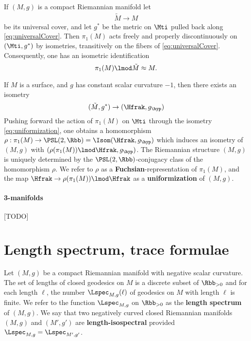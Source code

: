 
    If $(M,g)$ is a compact Riemannian manifold let
    \begin{align}\label{eq:universalCover}
        \tilde{M} \to M
    \end{align}
    be its universal cover, and let $g^*$ be the metric on $\Mti$ pulled back along \ref{eq:universalCover}. Then $\pi_1(M)$ acts freely and properly discontinuously on $(\Mti,g^*)$ by isometries, transitively on the fibers of \ref{eq:universalCover}. Consequently, one has an isometric identification
    \begin{align}
        \pi_1(M) \lmod \tilde{M} \approx M.
    \end{align}

    If $M$ is a surface, and $g$ has constant scalar curvature $-1$, then there exists an isometry
    \begin{align}\label{eq:uniformization}
        (\tilde{M},g^*) \to (\Hfrak , g_\hyp)
    \end{align}
    Pushing forward the action of $\pi_1(M)$ on $\Mti$ through the isometry \ref{eq:uniformization}, one obtains a homomorphism $\rho: \pi_1(M) \to \PSL(2,\Rbb) =\Isom(\Hfrak,g_\hyp)$ which induces an isometry of $(M,g)$ with $(\rho(\pi_1(M))\lmod \Hfrak,g_\hyp)$. The Riemannian structure  $(M,g)$ is uniquely determined by the $\PSL(2,\Rbb)$-conjugacy class of the homomorphism $\rho$. We refer to $\rho$ as a \textbf{Fuchsian}-representation of $\pi_1(M)$, and the map $\Hfrak \to \rho(\pi_1(M)) \lmod \Hfrak$ as a \textbf{uniformization} of $(M,g)$.




    \paragraph{3-manifolds}
    [TODO]
    \section{Length spectrum, trace formulae}

    Let $(M,g)$ be a compact Riemannian manifold with negative scalar curvature. The set of lengths of closed geodesics on $M$ is a discrete subset of $\Rbb_{>0}$ and for each length $\ell$, the number $\Lspec_{M,g}(\ell)$ of geodesics on $M$ with length $\ell$ is finite. We refer to the function $\Lspec_{M,g}$ on $\Rbb_{>0}$ as the \textbf{length spectrum} of $(M,g)$.  We say that two negatively curved closed Riemannian manifolds $(M,g)$ and $(M',g')$  are \textbf{length-isospectral} provided $\Lspec_{M,g} = \Lspec_{M',g'}$.


